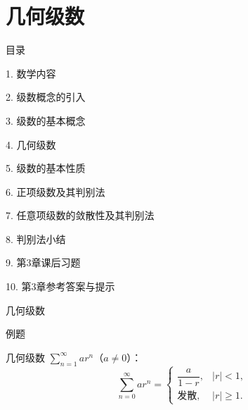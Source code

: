 \documentclass[aspectratio=169,10pt,fontset=fandol]{ctexbeamer}
\begin{document}
\section{几何级数}
\begin{frame}[t,fragile]{目录}
\normalsize
{\color{black}\normalsize 1. 数学内容\par}\vspace{0.3em}
{\color{black}\normalsize 2. 级数概念的引入\par}\vspace{0.3em}
{\color{black}\normalsize 3. 级数的基本概念\par}\vspace{0.3em}
{\color{blue}\normalsize 4. 几何级数\par}\vspace{0.3em}
{\color{gray!40}\normalsize 5. 级数的基本性质\par}\vspace{0.3em}
{\color{gray!40}\normalsize 6. 正项级数及其判别法\par}\vspace{0.3em}
{\color{gray!40}\normalsize 7. 任意项级数的敛散性及其判别法\par}\vspace{0.3em}
{\color{gray!40}\normalsize 8. 判别法小结\par}\vspace{0.3em}
{\color{gray!40}\normalsize 9. 第3章课后习题\par}\vspace{0.3em}
{\color{gray!40}\normalsize 10. 第3章参考答案与提示\par}\vspace{0.3em}
\end{frame}
\begin{frame}[t,fragile]{几何级数}
\footnotesize
\begin{block}{例题}
{\footnotesize

几何级数 \(\sum\limits_{n = 1}^{  \infty } ar^n\)（\(a \neq 0\)）：
\[
\sum_{n=0}^{\infty} ar^n = 
\begin{cases}
\dfrac{a}{1-r}, & |r| < 1,\\[6pt]
\text{发散}, & |r| \geq 1.
\end{cases}
\]

}
\end{block}
\end{frame}
\end{document}
